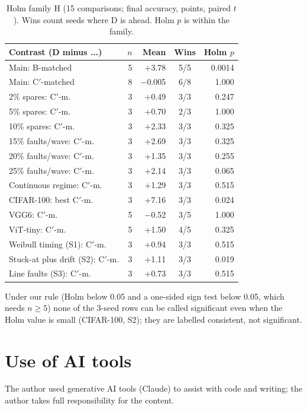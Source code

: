 \documentclass[journal]{IEEEtran}
\begin{document}
\begin{table}[t]
\centering
\caption{Holm family H (15 comparisons; final accuracy, points, paired $t$). Wins count seeds where D is ahead. Holm $p$ is within the family.}
\label{tab:familyh}
\footnotesize
\begin{tabular}{@{}p{3.55cm}rrcr@{}}
\toprule
Contrast (D minus ...) & $n$ & Mean & Wins & Holm $p$ \\
\midrule
Main: B-matched & 5 & +3.78 & 5/5 & 0.0014 \\
Main: C$'$-matched & 8 & $-$0.005 & 6/8 & 1.000 \\
2\% spares: C$'$-m. & 3 & +0.49 & 3/3 & 0.247 \\
5\% spares: C$'$-m. & 3 & +0.70 & 2/3 & 1.000 \\
10\% spares: C$'$-m. & 3 & +2.33 & 3/3 & 0.325 \\
15\% faults/wave: C$'$-m. & 3 & +2.69 & 3/3 & 0.325 \\
20\% faults/wave: C$'$-m. & 3 & +1.35 & 3/3 & 0.255 \\
25\% faults/wave: C$'$-m. & 3 & +2.14 & 3/3 & 0.065 \\
Continuous regime: C$'$-m. & 3 & +1.29 & 3/3 & 0.515 \\
CIFAR-100: best C$'$-m. & 3 & +7.16 & 3/3 & 0.024 \\
VGG6: C$'$-m. & 5 & $-$0.52 & 3/5 & 1.000 \\
ViT-tiny: C$'$-m. & 5 & +1.50 & 4/5 & 0.325 \\
Weibull timing (S1): C$'$-m. & 3 & +0.94 & 3/3 & 0.515 \\
Stuck-at plus drift (S2): C$'$-m. & 3 & +1.11 & 3/3 & 0.019 \\
Line faults (S3): C$'$-m. & 3 & +0.73 & 3/3 & 0.515 \\
\bottomrule
\end{tabular}
\end{table}

Under our rule (Holm below 0.05 and a one-sided sign test below 0.05, which needs $n\ge5$) none of the 3-seed rows can be called significant even when the Holm value is small (CIFAR-100, S2); they are labelled consistent, not significant.

\section*{Use of AI tools}
The author used generative AI tools (Claude) to assist with code and writing; the author takes full responsibility for the content.
\end{document}
